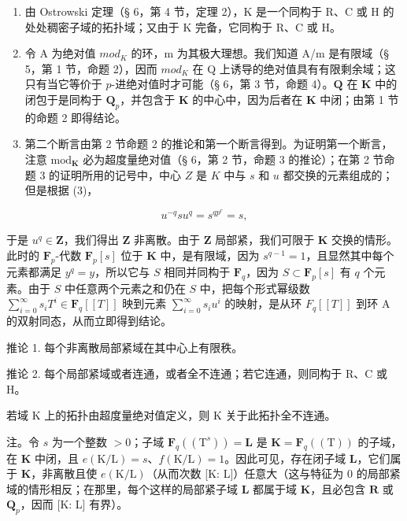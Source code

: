 \begin{enumerate}
\def\labelenumi{(\roman{enumi})}
\item
由 Ostrowski 定理（§ 6，第 4 节，定理 2），K 是一个同构于 R、C 或 H 的处处稠密子域的拓扑域；又由于 K 完备，它同构于 R、C 或 H。
\item
  令 A 为绝对值 \(mod_{K}\) 的环，m 为其极大理想。我们知道 A/m 是有限域（§ 5，第 1 节，命题 2），因而 \(mod_{K}\) 在 Q 上诱导的绝对值具有有限剩余域；这只有当它等价于 \(p\)-进绝对值时才可能（§ 6，第 3 节，命题 4）。\(\mathbf{Q}\) 在 \(\mathbf{K}\) 中的闭包于是同构于 \(\mathbf{Q}_p\)，并包含于 \(\mathbf{K}\) 的中心中，因为后者在 \(\mathbf{K}\) 中闭；由第 1 节的命题 2 即得结论。
\item
  第二个断言由第 2 节命题 2 的推论和第一个断言得到。为证明第一个断言，注意 \(\mathrm{mod}_{\mathbf{K}}\) 必为超度量绝对值（§ 6，第 2 节，命题 3 的推论）；在第 2 节命题 3 的证明所用的记号中，中心 \(Z\) 是 \(K\) 中与 \(s\) 和 \(u\) 都交换的元素组成的；但是根据 (3)，
\end{enumerate}

\[
u ^ {- q} s u ^ {q} = s ^ {q p ^ {r}} = s,
\]

于是 \(u^q \in \mathbf{Z}\)，我们得出 \(\mathbf{Z}\) 非离散。由于 \(\mathbf{Z}\) 局部紧，我们可限于 \(\mathbf{K}\) 交换的情形。此时的 \(\mathbf{F}_p\)-代数 \(\mathbf{F}_p[s]\) 位于 \(\mathbf{K}\) 中，是有限域，因为 \(s^{q-1} = 1\)，且显然其中每个元素都满足 \(y^q = y\)，所以它与 \(S\) 相同并同构于 \(\mathbf{F}_q\)，因为 \(S \subset \mathbf{F}_p[s]\) 有 \(q\) 个元素。由于 \(S\) 中任意两个元素之和仍在 \(S\) 中，把每个形式幂级数 \(\sum_{i=0}^{\infty} s_i T^i \in \mathbf{F}_q[[T]]\) 映到元素 \(\sum_{i=0}^{\infty}s_{i}u^{i}\) 的映射，是从环 \(F_{q}[[T]]\) 到环 A 的双射同态，从而立即得到结论。

推论 1. 每个非离散局部紧域在其中心上有限秩。

推论 2. 每个局部紧域或者连通，或者全不连通；若它连通，则同构于 R、C 或 H。

若域 K 上的拓扑由超度量绝对值定义，则 K 关于此拓扑全不连通。

注。令 \(s\) 为一个整数 \(>0\)；子域 \(\mathbf{F}_{q}((\mathrm{T}^{s})) = \mathbf{L}\) 是 \(\mathbf{K} = \mathbf{F}_{q}((\mathrm{T}))\) 的子域，在 \(\mathbf{K}\) 中闭，且 \(e(\mathrm{K/L}) = s\)、\(f(\mathrm{K/L}) = 1\)。因此可见，存在闭子域 \(\mathbf{L}\)，它们属于 \(\mathbf{K}\)，非离散且使 \(e(\mathrm{K/L})\)（从而次数 {[}K: L{]}）任意大（这与特征为 0 的局部紧域的情形相反；在那里，每个这样的局部紧子域 \(\mathbf{L}\) 都属于域 \(\mathbf{K}\)，且必包含 \(\mathbf{R}\) 或 \(\mathbf{Q}_{p}\)，因而 {[}K: L{]} 有界）。


